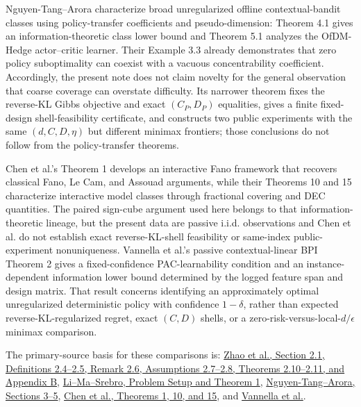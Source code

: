 \documentclass{article}
\begin{document}
Nguyen-Tang--Arora characterize broad unregularized offline contextual-bandit classes using policy-transfer coefficients and pseudo-dimension: Theorem 4.1 gives an information-theoretic class lower bound and Theorem 5.1 analyzes the OfDM-Hedge actor--critic learner. Their Example 3.3 already demonstrates that zero policy suboptimality can coexist with a vacuous concentrability coefficient. Accordingly, the present note does not claim novelty for the general observation that coarse coverage can overstate difficulty. Its narrower theorem fixes the reverse-KL Gibbs objective and exact \((C_P,D_P)\) equalities, gives a finite fixed-design shell-feasibility certificate, and constructs two public experiments with the same \((d,C,D,\eta)\) but different minimax frontiers; those conclusions do not follow from the policy-transfer theorems.

Chen et al.'s Theorem 1 develops an interactive Fano framework that recovers classical Fano, Le Cam, and Assouad arguments, while their Theorems 10 and 15 characterize interactive model classes through fractional covering and DEC quantities. The paired sign-cube argument used here belongs to that information-theoretic lineage, but the present data are passive i.i.d. observations and Chen et al. do not establish exact reverse-KL-shell feasibility or same-index public-experiment nonuniqueness. Vannella et al.'s passive contextual-linear BPI Theorem 2 gives a fixed-confidence PAC-learnability condition and an instance-dependent information lower bound determined by the logged feature span and design matrix. That result concerns identifying an approximately optimal unregularized deterministic policy with confidence \(1-\delta\), rather than expected reverse-KL-regularized regret, exact \((C,D)\) shells, or a zero-risk-versus-local-\(d/\epsilon\) minimax comparison.

The primary-source basis for these comparisons is: \href{https://arxiv.org/html/2502.06051v3}{Zhao et al., Section 2.1, Definitions 2.4--2.5, Remark 2.6, Assumptions 2.7--2.8, Theorems 2.10--2.11, and Appendix B}, \href{https://papers.nips.cc/paper\_files/paper/2022/file/8443219a991f068c34d9491ad68ffa94-Paper-Conference.pdf}{Li--Ma--Srebro, Problem Setup and Theorem 1}, \href{https://par.nsf.gov/servlets/purl/10572972}{Nguyen-Tang--Arora, Sections 3--5}, \href{https://proceedings.neurips.cc/paper\_files/paper/2024/file/8a23a95e26d016711c0d70f79ade3c95-Paper-Conference.pdf}{Chen et al., Theorems 1, 10, and 15}, and \href{https://arxiv.org/abs/2201.02169}{Vannella et al.}.
\end{document}
